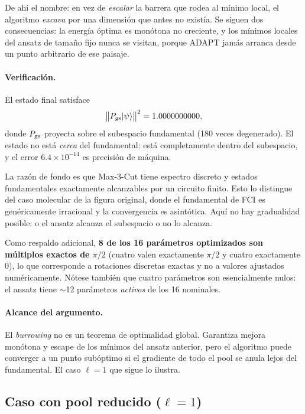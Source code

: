 \documentclass[11pt,a4paper]{article}
\newcommand{\ket}[1]{\lvert #1 \rangle}
\begin{document}
De ahí el nombre: en vez de \emph{escalar} la barrera que rodea al mínimo
local, el algoritmo \emph{excava} por una dimensión que antes no existía. Se
siguen dos consecuencias: la energía óptima es monótona no creciente, y los
mínimos locales del ansatz de tamaño fijo nunca se visitan, porque ADAPT jamás
arranca desde un punto arbitrario de ese paisaje.

\paragraph{Verificación.} El estado final satisface
\begin{equation}
\big\| P_{\rm gs}\ket{\psi}\big\|^2 = 1.0000000000 ,
\end{equation}
donde $P_{\rm gs}$ proyecta sobre el subespacio fundamental (180 veces
degenerado). El estado no está \emph{cerca} del fundamental: está
completamente dentro del subespacio, y el error $6.4\times10^{-14}$ es
precisión de máquina.

La razón de fondo es que Max-3-Cut tiene espectro discreto y estados
fundamentales exactamente alcanzables por un circuito finito. Esto lo distingue
del caso molecular de la figura original, donde el fundamental de FCI es
genéricamente irracional y la convergencia es asintótica. Aquí no hay
gradualidad posible: o el ansatz alcanza el subespacio o no lo alcanza.

Como respaldo adicional, \textbf{8 de los 16 parámetros optimizados son
múltiplos exactos de $\pi/2$} (cuatro valen exactamente $\pi/2$ y cuatro
exactamente $0$), lo que corresponde a rotaciones discretas exactas y no a
valores ajustados numéricamente. Nótese también que cuatro parámetros son
esencialmente nulos: el ansatz tiene $\sim$12 parámetros \emph{activos} de los
16 nominales.

\paragraph{Alcance del argumento.} El \emph{burrowing} no es un teorema de
optimalidad global. Garantiza mejora monótona y escape de los mínimos del
ansatz anterior, pero el algoritmo puede converger a un punto subóptimo si el
gradiente de todo el pool se anula lejos del fundamental. El caso $\ell=1$ que
sigue lo ilustra.

\subsection{Caso con pool reducido ($\ell=1$)}
\end{document}
